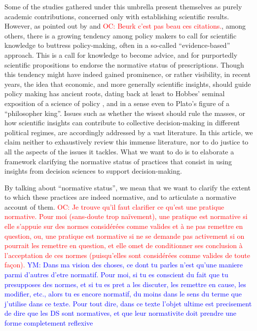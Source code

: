 \documentclass[preprint, french, english, 11pt]{elsarticle}%
\newcommand{\commentYM}[1]{\textcolor{blue}{YM: #1}}
\newcommand{\commentOC}[1]{\textcolor{red}{OC: #1}}
\begin{document}
Some of the studies gathered under this umbrella present themselves as purely academic contributions, concerned only with establishing scientific results. However, as pointed out by \cite{tsoukias_policy_2013} and \cite{marchi_evidence-based_2016} 
\commentOC{Beurk c’est pas beau ces citations.}, among others, there is a growing tendency among policy makers to call for scientific knowledge to buttress policy-making, often in a so-called ``evidence-based'' approach. This is a call for knowledge to become advice, and for purportedly scientific propositions to endorse the normative status of prescriptions. Though this tendency might have indeed gained prominence, or rather visibility, in recent years, the idea that economic, and more generally scientific insights, should guide policy making has ancient roots, dating back at least to Hobbes’ seminal exposition of a science of policy \citep{skinner_reason_1996}, and in a sense even to Plato's figure of a ``philosopher king''. Issues such as whether the wisest should rule the masses, or how scientific insights can contribute to collective decision-making in different political regimes, are accordingly addressed by a vast literature. In this article, we claim neither to exhaustively review this immense literature, nor to do justice to all the aspects of the issues it tackles. What we want to do is to elaborate a framework clarifying the normative status of practices that consist in using insights from decision sciences to support decision-making.

By talking about ``normative status'', we mean that we want to clarify the extent to which these practices are indeed normative, and to articulate a normative account of them. 
\commentOC{Je trouve qu’il faut clarifier ce qu’est une pratique normative. Pour moi (sans-doute trop naïvement), une pratique est normative si elle s’appuie sur des normes considérées comme valides et à ne pas remettre en question, ou, une pratique est normative si ne se demande pas activement si on pourrait les remettre en question, et elle omet de conditionner ses conclusion à l’acceptation de ces normes (puisqu’elles sont considérées comme valides de toute façon).}
\commentYM{Dans ma vision des choses, ce dont tu parles n'est qu'une maniere parmi d'autres d'etre normatif. Pour moi, si tu es conscient du fait que tu presupposes des normes, et si tu es pret a les discuter, les remettre en cause, les modifier, etc., alors tu es encore normatif, du moins dans le sens du terme que j'utilise dans ce texte. Pour tout dire, dans ce texte l'objet ultime est precisement de dire que les DS sont normatives, et que leur normativite doit prendre une forme completement reflexive} 
\end{document}

